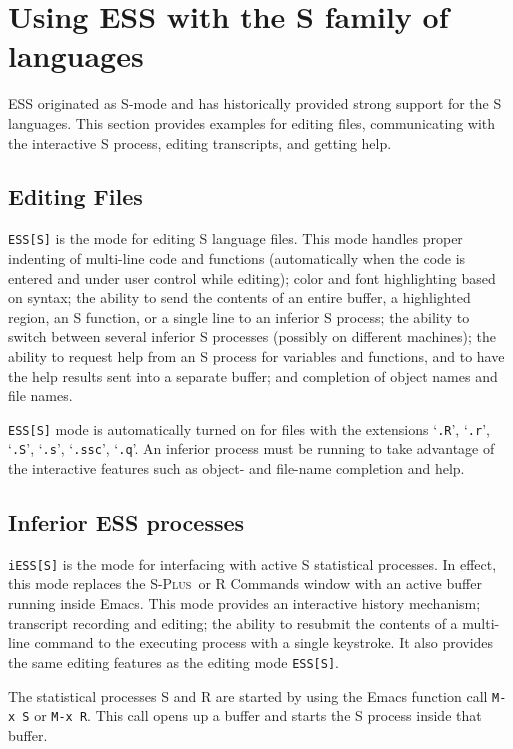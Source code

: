 \documentclass{article}
\newcommand*{\Splus}{\textsc{S-Plus}}
\newcommand{\stexttt}[1]{{\small\texttt{#1}}}
\newcommand{\file}[1]{`\stexttt{#1}'}
\begin{document}
\section{Using ESS with the S family of languages}
\label{sec:S}

ESS originated as S-mode and has historically provided strong support
for the S languages.  This section provides examples for editing
files, communicating with the interactive S process, editing
transcripts, and getting help.

\subsection{Editing Files}
\label{sec:S:edit}

\stexttt{ESS[S]} is the mode for editing S language files.  This mode
handles proper indenting of multi-line code and functions
(automatically when the code is entered and under user control while
editing); color and font highlighting based on syntax; the ability to
send the contents of an entire buffer, a highlighted region, an S
function, or a single line to an inferior S process; the ability to
switch between several inferior S processes (possibly on different
machines); the ability to request help from an S process for variables
and functions, and to have the help results sent into a separate
buffer; and completion of object names and file names.

\stexttt{ESS[S]} mode is automatically turned on for files with the
extensions \file{.R}, \file{.r}, \file{.S}, \file{.s}, \file{.ssc},
\file{.q}.  An inferior process must be running to take advantage of
the interactive features such as object- and file-name completion and
help.

\subsection{Inferior ESS processes}
\label{sec:S:inf}

\stexttt{iESS[S]} is the mode for interfacing with active S
statistical processes.  In effect, this mode replaces the \Splus\ or R
Commands window with an active buffer running inside Emacs.  This mode
provides an interactive history mechanism; transcript recording and
editing; the ability to resubmit the contents of a multi-line command
to the executing process with a single keystroke.  It also provides
the same editing features as the editing mode \stexttt{ESS[S]}.

The statistical processes S and R are started by using the Emacs
function call \stexttt{M-x~S} or \stexttt{M-x~R}.  This call opens up
a buffer and starts the S process inside that buffer.
\end{document}
